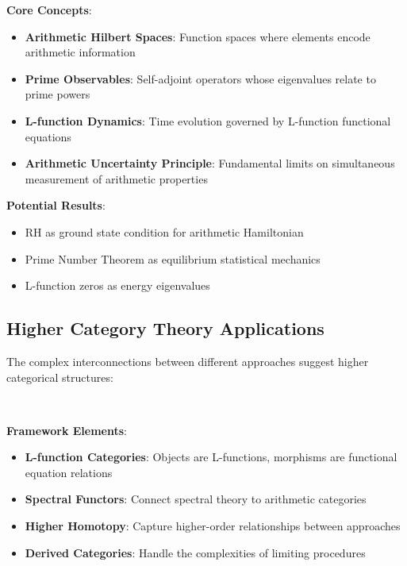 \begin{framework}
\textbf{Core Concepts}:
\begin{itemize}
\item \textbf{Arithmetic Hilbert Spaces}: Function spaces where elements encode arithmetic information
\item \textbf{Prime Observables}: Self-adjoint operators whose eigenvalues relate to prime powers
\item \textbf{L-function Dynamics}: Time evolution governed by L-function functional equations
\item \textbf{Arithmetic Uncertainty Principle}: Fundamental limits on simultaneous measurement of arithmetic properties
\end{itemize}

\textbf{Potential Results}:
\begin{itemize}
\item RH as ground state condition for arithmetic Hamiltonian
\item Prime Number Theorem as equilibrium statistical mechanics
\item L-function zeros as energy eigenvalues
\end{itemize}
\end{framework}

\subsection{Higher Category Theory Applications}
\label{subsec:higher_category}

The complex interconnections between different approaches suggest higher categorical structures:

\begin{research_direction}
~
\end{research_direction}

\noindent\textbf{Framework Elements}:
\begin{itemize}
\item \textbf{L-function Categories}: Objects are L-functions, morphisms are functional equation relations
\item \textbf{Spectral Functors}: Connect spectral theory to arithmetic categories
\item \textbf{Higher Homotopy}: Capture higher-order relationships between approaches
\item \textbf{Derived Categories}: Handle the complexities of limiting procedures
\end{itemize}

